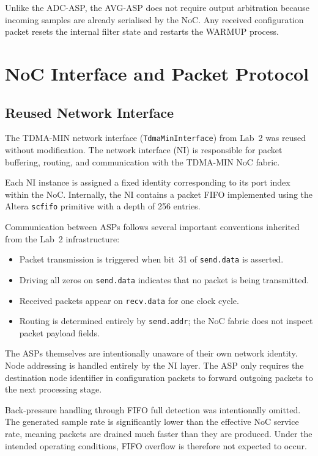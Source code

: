 \documentclass[10pt, a4paper]{article}
\begin{document}
Unlike the ADC-ASP, the AVG-ASP does not require output arbitration because incoming samples are already serialised by the NoC. Any received configuration packet resets the internal filter state and restarts the WARMUP process.

\section{NoC Interface and Packet Protocol}
\label{sec:noc_protocol}

\subsection{Reused Network Interface}

The TDMA-MIN network interface (\texttt{TdmaMinInterface}) from Lab~2 was reused without modification. The network interface (NI) is responsible for packet buffering, routing, and communication with the TDMA-MIN NoC fabric.

Each NI instance is assigned a fixed identity corresponding to its port index within the NoC. Internally, the NI contains a packet FIFO implemented using the Altera \texttt{scfifo} primitive with a depth of 256 entries.

Communication between ASPs follows several important conventions inherited from the Lab~2 infrastructure:

\begin{itemize}
    \item Packet transmission is triggered when bit~31 of \texttt{send.data} is asserted.
    \item Driving all zeros on \texttt{send.data} indicates that no packet is being transmitted.
    \item Received packets appear on \texttt{recv.data} for one clock cycle.
    \item Routing is determined entirely by \texttt{send.addr}; the NoC fabric does not inspect packet payload fields.
\end{itemize}

The ASPs themselves are intentionally unaware of their own network identity. Node addressing is handled entirely by the NI layer. The ASP only requires the destination node identifier in configuration packets to forward outgoing packets to the next processing stage.

Back-pressure handling through FIFO full detection was intentionally omitted. The generated sample rate is significantly lower than the effective NoC service rate, meaning packets are drained much faster than they are produced. Under the intended operating conditions, FIFO overflow is therefore not expected to occur.
\end{document}
